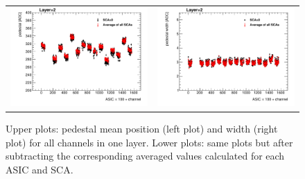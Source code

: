 \documentclass[a4paper,11pt]{article}
\begin{document}
\begin{figure}[!t]
  \centering
  \begin{tabular}{ll}
    \includegraphics[width=2.8in]{ped_mean_layer2-eps-converted-to.pdf} & \includegraphics[width=2.8in]{width_mean_layer2-eps-converted-to.pdf} 
  \end{tabular}
  \caption{Upper plots: pedestal mean position (left plot) and width (right plot) for all channels in one layer. Lower plots: same plots but after subtracting the corresponding averaged values calculated for each ASIC and SCA.}
\label{pedestal_layer}
\end{figure}
\end{document}
